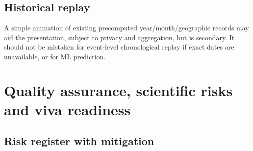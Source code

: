 \documentclass[11pt,a4paper,openany]{report}
\begin{document}
\section{Historical replay}
A simple animation of existing precomputed year/month/geographic records may aid the presentation, subject to privacy and aggregation, but is secondary. It should not be mistaken for event-level chronological replay if exact dates are unavailable, or for ML prediction.

\chapter{Quality assurance, scientific risks and viva readiness}
\section{Risk register with mitigation}
\small
\end{document}
